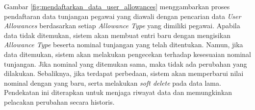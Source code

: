 Gambar \ref{fig:mendaftarkan_data_user_allowances} menggambarkan proses pendaftaran data tunjangan pegawai yang diawali dengan pencarian data \textit{User Allowances} berdasarkan setiap \textit{Allowance Type} yang dimiliki pegawai. Apabila data tidak ditemukan, sistem akan membuat entri baru dengan mengisikan \textit{Allowance Type} beserta nominal tunjangan yang telah ditentukan. Namun, jika data ditemukan, sistem akan melakukan pengecekan terhadap kesesuaian nominal tunjangan. Jika nominal yang ditemukan sama, maka tidak ada perubahan yang dilakukan. Sebaliknya, jika terdapat perbedaan, sistem akan memperbarui nilai nominal dengan yang baru, serta melakukan \textit{soft delete} pada data lama. Pendekatan ini diterapkan untuk menjaga riwayat data dan memungkinkan pelacakan perubahan secara historis.

